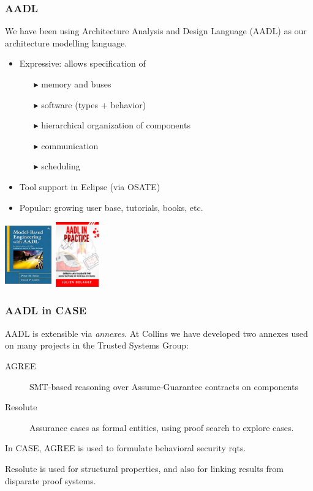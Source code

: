 \documentclass{beamer}
\begin{document}
\begin{frame}\frametitle{AADL}

We have been using Architecture Analysis and Design Language (AADL) as
our architecture modelling language.

\begin {itemize}
\item Expressive: allows specification of
\begin{itemize}
     \item [$\blacktriangleright$] memory and buses
     \item [$\blacktriangleright$] software (types + behavior)
      \item[$\blacktriangleright$] hierarchical organization of components
     \item [$\blacktriangleright$] communication
     \item [$\blacktriangleright$] scheduling
\end{itemize}
\item Tool support in Eclipse (via OSATE)
\item Popular: growing user base, tutorials, books, etc.
\end{itemize}

\hspace*{30mm}
\includegraphics[width=20mm,height=28mm]{book-title-0.jpg}
\hspace*{5mm}
\includegraphics[width=20mm,height=28mm]{book-cover.jpg}


\end{frame}

\begin{frame}\frametitle{AADL in CASE}

AADL is extensible via \emph{annexes}. At Collins we have developed
two annexes used on many projects in the Trusted Systems Group:

\begin{description}
\item [AGREE] SMT-based reasoning over Assume-Guarantee contracts on components
\item [Resolute] Assurance cases as formal entities, using proof search to explore cases.
\end{description}

In CASE, AGREE is used to formulate behavioral security rqts.

Resolute is used for structural properties, and also for linking
results from disparate proof systems.

\end{frame}
\end{document}
